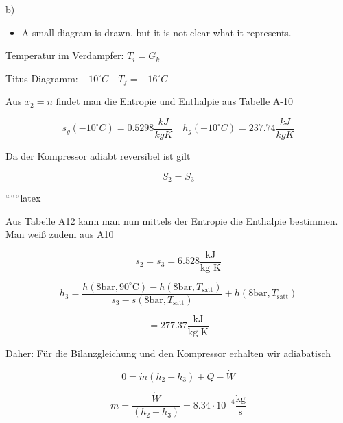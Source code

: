 b)

\begin{itemize}
    \item A small diagram is drawn, but it is not clear what it represents.
\end{itemize}

Temperatur im Verdampfer: $T_i = G_k$

Titus Diagramm: $-10^\circ C \quad T_f = -16^\circ C$

Aus $x_2 = n$ findet man die Entropie und Enthalpie aus Tabelle A-10

\[
s_g(-10^\circ C) = 0.5298 \frac{kJ}{kgK} \quad h_g(-10^\circ C) = 237.74 \frac{kJ}{kgK}
\]

Da der Kompressor adiabt reversibel ist gilt

\[
S_2 = S_3
\]

``````latex


Aus Tabelle A12 kann man nun mittels der Entropie die Enthalpie bestimmen. Man weiß zudem aus A10

\[
s_2 = s_3 = 6.528 \frac{\text{kJ}}{\text{kg K}}
\]

\[
h_3 = \frac{h(8 \text{bar}, 90^\circ \text{C}) - h(8 \text{bar}, T_{\text{satt}})}{s_3 - s(8 \text{bar}, T_{\text{satt}})} + h(8 \text{bar}, T_{\text{satt}})
\]

\[
= 277.37 \frac{\text{kJ}}{\text{kg K}}
\]

Daher: Für die Bilanzgleichung und den Kompressor erhalten wir adiabatisch

\[
0 = \dot{m} (h_2 - h_3) + \dot{Q} - \dot{W}
\]

\[
\dot{m} = \frac{\dot{W}}{(h_2 - h_3)} = 8.34 \cdot 10^{-4} \frac{\text{kg}}{\text{s}}
\]